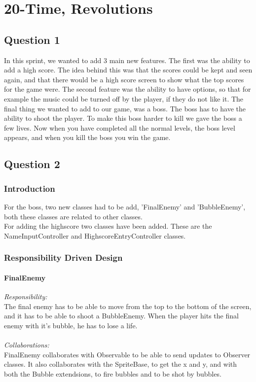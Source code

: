 \chapter{20-Time, Revolutions}

\section{Question 1}

In this sprint, we wanted to add 3 main new features. The first was the ability to add a high score. The idea behind this was that the scores could be kept and seen again, and that there would be a high score screen to show what the top scores for the game were. The second feature was the ability to have options, so that for example the music could be turned off by the player, if they do not like it. The final thing we wanted to add to our game, was a boss. The boss has to have the ability to shoot the player. To make this boss harder to kill we gave the boss a few lives. Now when you have completed all the normal levels, the boss level appears, and when you kill the boss you win the game.

\section{Question 2}

\subsection{Introduction}

For the boss, two new classes had to be add, 'FinalEnemy' and 'BubbleEnemy', both these classes are related to other classes. \\
For adding the highscore two classes have been added. These are the NameInputController and HighscoreEntryController classes. 

\subsection{Responsibility Driven Design} 

\subsubsection{FinalEnemy}
\textit{Responsibility:} \\
The final enemy has to be able to move from the top to the bottom of the screen, and it has to be able to shoot a BubbleEnemy. When the player hits the final enemy with it's bubble, he has to lose a life. \\ \\
\textit{Collaborations:} \\
FinalEnemy collaborates with Observable to be able to send updates to Observer classes. It also collaborates with  the SpriteBase, to get the x and y, and with both the Bubble extendsions, to fire bubbles and to be shot by bubbles.


